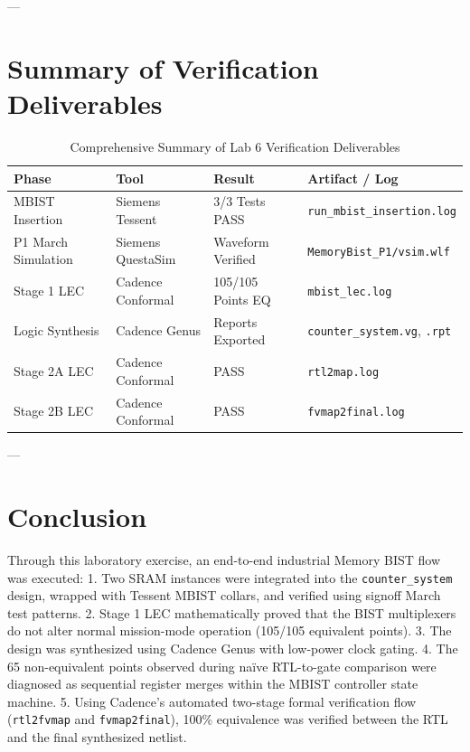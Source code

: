 \documentclass[12pt]{article}
\begin{document}
---

\section{Summary of Verification Deliverables}

\begin{table}[H]
\centering
\begin{tabular}{|p{3.5cm}|p{3.5cm}|p{3.0cm}|p{4.0cm}|}
\hline
\textbf{Phase} & \textbf{Tool} & \textbf{Result} & \textbf{Artifact / Log} \\
\hline
MBIST Insertion & Siemens Tessent & 3/3 Tests PASS & \texttt{run\_mbist\_insertion.log} \\
P1 March Simulation & Siemens QuestaSim & Waveform Verified & \texttt{MemoryBist\_P1/vsim.wlf} \\
Stage 1 LEC & Cadence Conformal & 105/105 Points EQ & \texttt{mbist\_lec.log} \\
Logic Synthesis & Cadence Genus & Reports Exported & \texttt{counter\_system.vg}, \texttt{.rpt} \\
Stage 2A LEC & Cadence Conformal & PASS & \texttt{rtl2map.log} \\
Stage 2B LEC & Cadence Conformal & PASS & \texttt{fvmap2final.log} \\
\hline
\end{tabular}
\caption{Comprehensive Summary of Lab 6 Verification Deliverables}
\end{table}

---

\section{Conclusion}

Through this laboratory exercise, an end-to-end industrial Memory BIST flow was executed:
1. Two SRAM instances were integrated into the \texttt{counter\_system} design, wrapped with Tessent MBIST collars, and verified using signoff March test patterns.
2. Stage 1 LEC mathematically proved that the BIST multiplexers do not alter normal mission-mode operation (105/105 equivalent points).
3. The design was synthesized using Cadence Genus with low-power clock gating.
4. The 65 non-equivalent points observed during naïve RTL-to-gate comparison were diagnosed as sequential register merges within the MBIST controller state machine.
5. Using Cadence's automated two-stage formal verification flow (\texttt{rtl2fvmap} and \texttt{fvmap2final}), 100\% equivalence was verified between the RTL and the final synthesized netlist.
\end{document}
